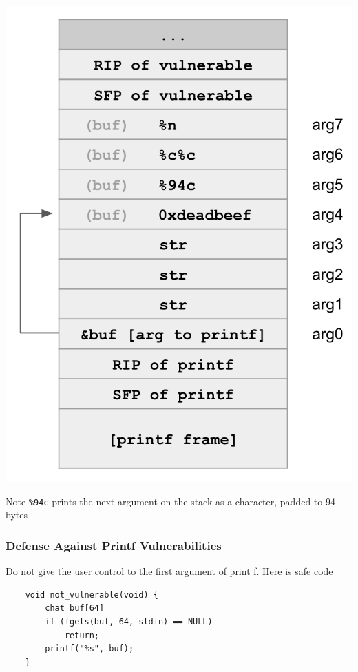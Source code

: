 \documentclass{article}
\begin{document}
\begin{example}[\%n example]
    \begin{center}
        \includegraphics[scale=0.5]{images/example-n-stack-diagram.png}
    \end{center}
    Note \lstinline{%94c} prints the next argument on the stack as a character, padded to 94 bytes

\end{example}


\newpage
\subsubsection{Defense Against Printf Vulnerabilities}
Do not give the user control to the first argument of print f. Here is safe code
\begin{lstlisting}
    void not_vulnerable(void) {
        chat buf[64]
        if (fgets(buf, 64, stdin) == NULL)
            return;
        printf("%s", buf);
    }
\end{lstlisting}
\end{document}
